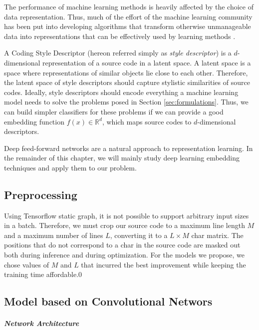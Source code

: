 The performance of machine learning methods is heavily affected by the choice of data representation. Thus, much of the effort of the machine learning community has been put into developing algorithms that transform otherwise unmanageable data into representations that can be effectively used by learning methods \cite{representation_learning}.

A Coding Style Descriptor (hereon referred simply as \textit{style descriptor}) is a $d$-dimensional representation of a source code in a latent space. A latent space is a space where representations of similar objects lie close to each other. Therefore, the latent space of style descriptors should capture stylistic similarities of source codes. Ideally, style descriptors should encode everything a machine learning model needs to solve the problems posed in Section \ref{sec:formulations}. Thus, we can build simpler classifiers for these problems if we can provide a good embedding function $f(x) \in \mathbb{R}^d$, which maps source codes to $d$-dimensional descriptors.


Deep feed-forward networks are a natural approach to representation learning. In the remainder of this chapter, we will mainly study deep learning embedding techniques and apply them to our problem.

\subsection{Preprocessing}\label{sec:preprocessing}

Using Tensorflow static graph, it is not possible to support arbitrary input sizes in a batch. Therefore, we must crop our source code to a maximum line length $M$ and a maximum number of lines $L$, converting it to a $L \times M$ char matrix. The positions that do not correspond to a char in the source code are masked out both during inference and during optimization. For the models we propose, we chose values of $M$ and $L$ that incurred the best improvement while keeping the training time affordable.0

\subsection{Model based on Convolutional Networs}

\subparagraph*{Network Architecture}

